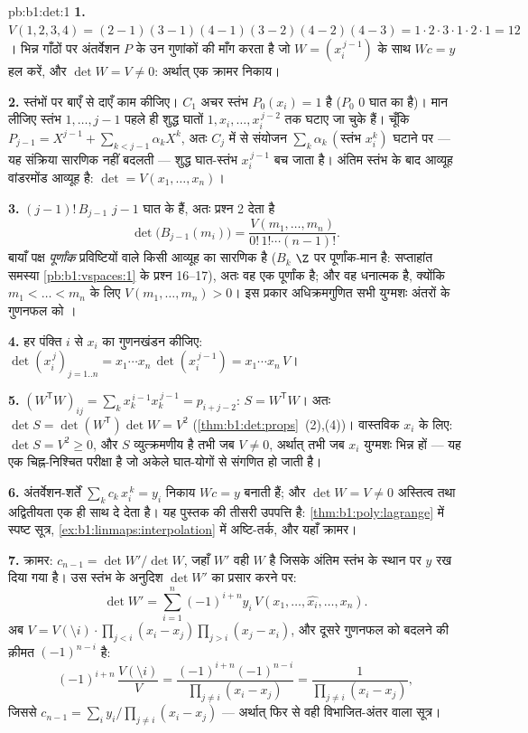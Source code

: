 \begin{solution}{pb:b1:det:1}
\textbf{1.} $V(1,2,3,4) = (2-1)(3-1)(4-1)(3-2)(4-2)(4-3) = 1 \cdot 2\cdot
3\cdot 1\cdot 2\cdot 1 = 12$। भिन्न गाँठों पर अंतर्वेशन $P$ के उन गुणांकों
की माँग करता है जो $W = (x_i^{\,j-1})$ के साथ $W c = y$ हल करें, और $\det W
= V \neq 0$: अर्थात् एक क्रामर निकाय।

\textbf{2.} स्तंभों पर बाएँ से दाएँ काम कीजिए। $C_1$ अचर स्तंभ $P_0(x_i) =
1$ है ($P_0$ $0$ घात का  है)। मान लीजिए स्तंभ $1, \dots, j-1$ पहले
ही शुद्ध घातों $1, x_i, \dots, x_i^{\,j-2}$ तक घटाए जा चुके हैं। चूँकि
$P_{j-1} = X^{j-1} + \sum_{k < j-1}\alpha_k X^k$, अतः $C_j$ में से संयोजन
$\sum_k \alpha_k\,(\text{स्तंभ } x_i^k)$ घटाने पर --- यह संक्रिया सारणिक
नहीं बदलती --- शुद्ध घात-स्तंभ $x_i^{\,j-1}$ बच जाता है। अंतिम स्तंभ के बाद
आव्यूह वांडरमोंड आव्यूह है: $\det = V(x_1, \dots, x_n)$।

\textbf{3.}  $(j-1)!\,B_{j-1}$ $j - 1$ घात के  हैं, अतः प्रश्न
2 देता है
\[
\det\bigl(B_{j-1}(m_i)\bigr)
= \frac{V(m_1, \dots, m_n)}{0!\,1!\cdots(n-1)!} .
\]
बायाँ पक्ष \emph{पूर्णांक} प्रविष्टियों वाले किसी आव्यूह का सारणिक है ($B_k$
$\Z$ पर पूर्णांक-मान है: सप्ताहांत समस्या \cref{pb:b1:vspaces:1} के प्रश्न
16--17), अतः वह एक पूर्णांक है; और वह धनात्मक है, क्योंकि $m_1 < \dots <
m_n$ के लिए $V(m_1, \dots, m_n) > 0$। इस प्रकार अधिक्रमगुणित सभी युग्मशः
अंतरों के गुणनफल को ।

\textbf{4.} हर पंक्ति $i$ से $x_i$ का गुणनखंडन कीजिए: $\det(x_i^{\,j})_{j =
1..n} = x_1\cdots x_n\, \det(x_i^{\,j-1}) = x_1\cdots x_n\,V$।

\textbf{5.} $(W^{\mathsf T}W)_{ij} = \sum_k x_k^{\,i-1} x_k^{\,j-1} =
p_{i+j-2}$: $S = W^{\mathsf T}W$। अतः $\det S = \det(W^{\mathsf T})\det W =
V^2$ (\cref{thm:b1:det:props}~(2),(4))। वास्तविक $x_i$ के लिए: $\det S = V^2
\geq 0$, और $S$ व्युत्क्रमणीय है तभी जब $V \neq 0$, अर्थात् तभी जब $x_i$
युग्मशः भिन्न हों --- यह एक चिह्न-निश्चित परीक्षा है जो अकेले घात-योगों से
संगणित हो जाती है।

\textbf{6.} अंतर्वेशन-शर्तें $\sum_{k} c_k\,x_i^{\,k} = y_i$ निकाय $Wc = y$
बनाती हैं; और $\det W = V \neq 0$ अस्तित्व तथा अद्वितीयता एक ही साथ दे देता
है। यह पुस्तक की तीसरी उपपत्ति है: \cref{thm:b1:poly:lagrange} में स्पष्ट
सूत्र, \cref{ex:b1:linmaps:interpolation} में अष्टि-तर्क, और यहाँ क्रामर।

\textbf{7.} क्रामर: $c_{n-1} = \det W'/\det W$, जहाँ $W'$ वही $W$ है जिसके
अंतिम स्तंभ के स्थान पर $y$ रख दिया गया है। उस स्तंभ के अनुदिश $\det W'$ का
प्रसार करने पर:
\[
\det W' = \sum_{i=1}^n (-1)^{i+n} y_i\,V(x_1, \dots, \widehat{x_i},
\dots, x_n) .
\]
अब $V = V(\setminus i)\cdot\prod_{j<i}(x_i - x_j)\prod_{j>i} (x_j - x_i)$,
और दूसरे गुणनफल को बदलने की क़ीमत $(-1)^{n-i}$ है:
\[
(-1)^{i+n}\,\frac{V(\setminus i)}{V}
= \frac{(-1)^{i+n}(-1)^{n-i}}{\prod_{j\neq i}(x_i - x_j)}
= \frac{1}{\prod_{j\neq i}(x_i - x_j)} ,
\]
जिससे $c_{n-1} = \sum_i y_i/\prod_{j \neq i}(x_i - x_j)$ --- अर्थात् फिर से
वही विभाजित-अंतर वाला सूत्र।


\end{solution}
